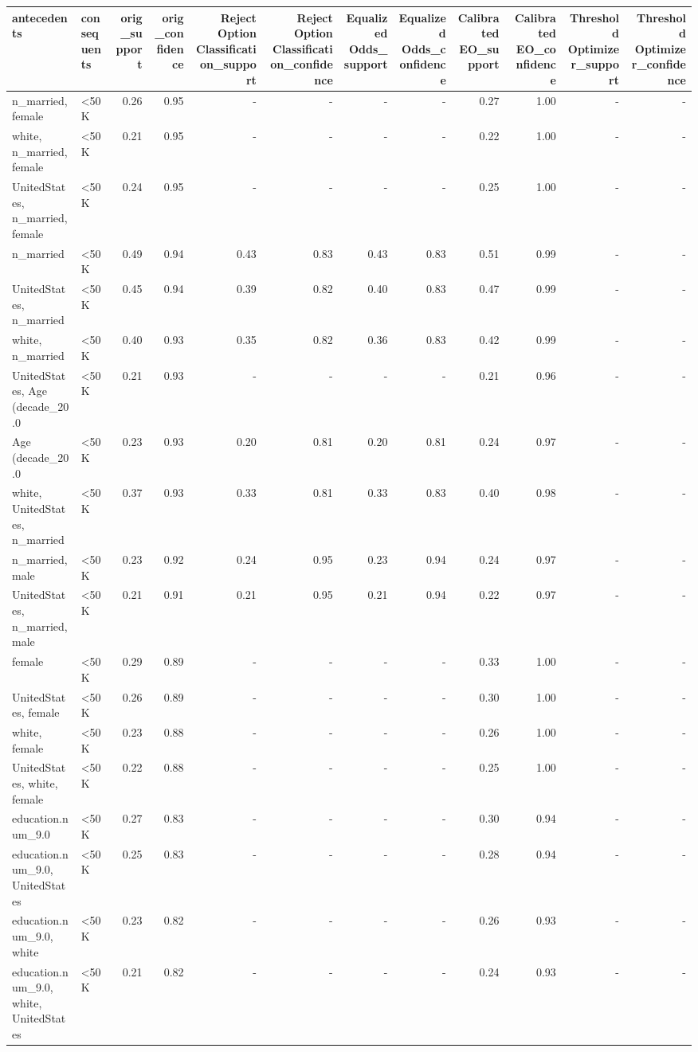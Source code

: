 \begin{tabular}{llrrrrrrrrrr}
\toprule
antecedents & consequents & orig\_support & orig\_confidence & Reject Option Classification\_support & Reject Option Classification\_confidence & Equalized Odds\_support & Equalized Odds\_confidence & Calibrated EO\_support & Calibrated EO\_confidence & Threshold Optimizer\_support & Threshold Optimizer\_confidence \\
\midrule
n\_married, female & <50K & 0.26 & 0.95 & - & - & - & - & 0.27 & 1.00 & - & - \\
white, n\_married, female & <50K & 0.21 & 0.95 & - & - & - & - & 0.22 & 1.00 & - & - \\
UnitedStates, n\_married, female & <50K & 0.24 & 0.95 & - & - & - & - & 0.25 & 1.00 & - & - \\
n\_married & <50K & 0.49 & 0.94 & 0.43 & 0.83 & 0.43 & 0.83 & 0.51 & 0.99 & - & - \\
UnitedStates, n\_married & <50K & 0.45 & 0.94 & 0.39 & 0.82 & 0.40 & 0.83 & 0.47 & 0.99 & - & - \\
white, n\_married & <50K & 0.40 & 0.93 & 0.35 & 0.82 & 0.36 & 0.83 & 0.42 & 0.99 & - & - \\
UnitedStates, Age (decade\_20.0 & <50K & 0.21 & 0.93 & - & - & - & - & 0.21 & 0.96 & - & - \\
Age (decade\_20.0 & <50K & 0.23 & 0.93 & 0.20 & 0.81 & 0.20 & 0.81 & 0.24 & 0.97 & - & - \\
white, UnitedStates, n\_married & <50K & 0.37 & 0.93 & 0.33 & 0.81 & 0.33 & 0.83 & 0.40 & 0.98 & - & - \\
n\_married, male & <50K & 0.23 & 0.92 & 0.24 & 0.95 & 0.23 & 0.94 & 0.24 & 0.97 & - & - \\
UnitedStates, n\_married, male & <50K & 0.21 & 0.91 & 0.21 & 0.95 & 0.21 & 0.94 & 0.22 & 0.97 & - & - \\
female & <50K & 0.29 & 0.89 & - & - & - & - & 0.33 & 1.00 & - & - \\
UnitedStates, female & <50K & 0.26 & 0.89 & - & - & - & - & 0.30 & 1.00 & - & - \\
white, female & <50K & 0.23 & 0.88 & - & - & - & - & 0.26 & 1.00 & - & - \\
UnitedStates, white, female & <50K & 0.22 & 0.88 & - & - & - & - & 0.25 & 1.00 & - & - \\
education.num\_9.0 & <50K & 0.27 & 0.83 & - & - & - & - & 0.30 & 0.94 & - & - \\
education.num\_9.0, UnitedStates & <50K & 0.25 & 0.83 & - & - & - & - & 0.28 & 0.94 & - & - \\
education.num\_9.0, white & <50K & 0.23 & 0.82 & - & - & - & - & 0.26 & 0.93 & - & - \\
education.num\_9.0, white, UnitedStates & <50K & 0.21 & 0.82 & - & - & - & - & 0.24 & 0.93 & - & - \\
\bottomrule
\end{tabular}
